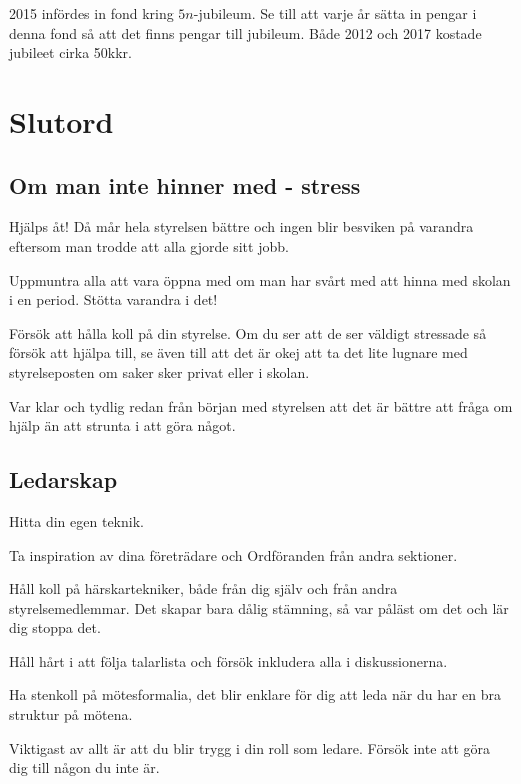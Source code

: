 \documentclass[10pt]{article}
\begin{document}
    2015 infördes in fond kring $5n$-jubileum. Se till att varje år sätta in pengar i denna fond så att det finns pengar till jubileum. Både 2012 och 2017 kostade jubileet cirka 50kkr.
    
    \section{Slutord}
    
    \subsection{Om man inte hinner med - stress}
    
    \begin{dashlist}
        \item Hjälps åt! Då mår hela styrelsen bättre och ingen blir besviken på varandra eftersom man trodde att alla gjorde sitt jobb.
        \item Uppmuntra alla att vara öppna med om man har svårt med att hinna med skolan i en period. Stötta varandra i det!
        \item Försök att hålla koll på din styrelse. Om du ser att de ser väldigt stressade så försök att hjälpa till, se även till att det är okej att ta det lite lugnare med styrelseposten om saker sker privat eller i skolan.
        \item Var klar och tydlig redan från början med styrelsen att det är bättre att fråga om hjälp än att strunta i att göra något.
    \end{dashlist}
    
    \subsection{Ledarskap}
    
    \begin{dashlist}
        \item Hitta din egen teknik.
        \item Ta inspiration av dina företrädare och Ordföranden från andra sektioner.
        \item Håll koll på härskartekniker, både från dig själv och från andra styrelsemedlemmar. Det skapar bara dålig stämning, så var påläst om det och lär dig stoppa det.
        \item Håll hårt i att följa talarlista och försök inkludera alla i diskussionerna.
        \item Ha stenkoll på mötesformalia, det blir enklare för dig att leda när du har en bra struktur på mötena.
        \item Viktigast av allt är att du blir trygg i din roll som ledare. Försök inte att göra dig till någon du inte är.
    \end{dashlist}
    
\end{document}
